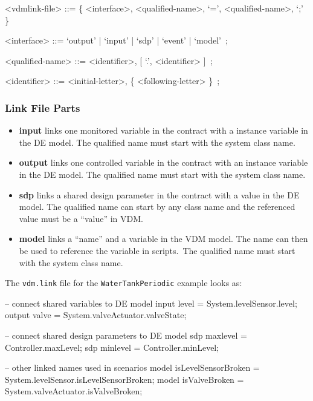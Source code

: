 \documentclass{crescendorepchap}
\newcommand{\vdmkeyw}[1]{{\bf\ttfamily #1}}
\begin{document}
\begin{grammar}
<vdmlink-file> ::= \{ <interface>, <qualified-name>, `=', <qualified-name>, `;' \}

<interface> ::= `output' | `input'  | `sdp' | `event'  | `model'~;

<qualified-name> ::= <identifier>, {[} `.', <identifier> {]}~;

<identifier> ::= <initial-letter>, \{ <following-letter> \}~;
\end{grammar}

\subsubsection{Link File Parts}

\begin{itemize}
\item
  \vdmkeyw{input} links one monitored variable in the contract with a
  instance variable in the DE model. The qualified name must start with
  the system class name.
\item
  \vdmkeyw{output} links one controlled variable in the contract with
  an instance variable in the DE model. The qualified name must start
  with the system class name.
\item
  \vdmkeyw{sdp} links a shared design parameter in the contract with
  a value in the DE model. The qualified name can start by any
  class name and the referenced value must be a ``value'' in VDM.
\item
  \vdmkeyw{model} links a ``name'' and a variable in the VDM model. The
  name can then be used to reference the variable in scripts.~The
  qualified name must start with the system class name.
\end{itemize}

The \texttt{vdm.link} file for the \texttt{WaterTankPeriodic} example looks as:

\begin{dcl}
-- connect shared variables to DE model
input level = System.levelSensor.level; 
output valve = System.valveActuator.valveState;

-- connect shared design parameters to DE model
sdp maxlevel = Controller.maxLevel;
sdp minlevel = Controller.minLevel;
	
-- other linked names used in scenarios
model isLevelSensorBroken = 
                   System.levelSensor.isLevelSensorBroken;
model isValveBroken = 
                   System.valveActuator.isValveBroken;
\end{dcl}
\end{document}
